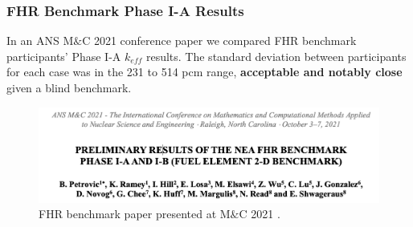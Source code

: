 \begin{frame}
    \frametitle{FHR Benchmark Phase I-A Results}
    In an ANS M$\&$C 2021 conference paper we compared FHR benchmark participants' 
    Phase I-A $k_{eff}$ results. 
    The standard deviation between participants for each case was in the 231 to 514 
    pcm range, \textbf{acceptable and notably close} given a blind benchmark.

    \begin{figure}[]
        \centering
        \includegraphics[width=0.85\linewidth]{figures/mnc.png} 
        \caption{FHR benchmark paper presented at M$\&$C 2021 
        \cite{petrovic_preliminary_2021}.}
    \end{figure}
\end{frame}

